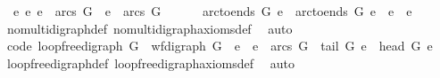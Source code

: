 \begin{isabellebody}
\ \ {\isacharparenleft}{\kern0pt}{\isasymforall}e{}\ e{}{\isachardot}{\kern0pt}\ e{}\ {\isasymin}\ arcs\ G\ {\isasymand}\ e{}\ {\isasymin}\ arcs\ G\ {\isasymand}\isanewline
\ \ \ \ \ arc{\isacharunderscore}{\kern0pt}to{\isacharunderscore}{\kern0pt}ends\ G\ e{}\ {\isacharequal}{\kern0pt}\ arc{\isacharunderscore}{\kern0pt}to{\isacharunderscore}{\kern0pt}ends\ G\ e{}\ {\isasymlongrightarrow}\ e{}\ {\isacharequal}{\kern0pt}\ e{}{\isacharparenright}{\kern0pt}{\isacharparenright}{\kern0pt}{\isachardoublequoteclose}\isanewline
%
\isadelimproof
\ \ %
\endisadelimproof
%
\isatagproof
{}\isamarkupfalse%
\ nomulti{\isacharunderscore}{\kern0pt}digraph{\isacharunderscore}{\kern0pt}def\ nomulti{\isacharunderscore}{\kern0pt}digraph{\isacharunderscore}{\kern0pt}axioms{\isacharunderscore}{\kern0pt}def\ \isamarkupfalse%
\ auto%
\endisatagproof
{\isafoldproof}%
%
\isadelimproof
\isanewline
%
\endisadelimproof
\isanewline
{}\isamarkupfalse%
\ {\isacharbrackleft}{\kern0pt}code{\isacharbrackright}{\kern0pt}{\isacharcolon}{\kern0pt}\ {\isachardoublequoteopen}loopfree{\isacharunderscore}{\kern0pt}digraph\ G\ {\isacharequal}{\kern0pt}\ {\isacharparenleft}{\kern0pt}wf{\isacharunderscore}{\kern0pt}digraph\ G\ {\isasymand}\ {\isacharparenleft}{\kern0pt}{\isasymforall}e{\isachardot}{\kern0pt}\ \ e\ {\isasymin}\ arcs\ G\ {\isasymlongrightarrow}\ tail\ G\ e\ {\isasymnoteq}\ head\ G\ e{\isacharparenright}{\kern0pt}{\isacharparenright}{\kern0pt}{\isachardoublequoteclose}\isanewline
%
\isadelimproof
\ \ %
\endisadelimproof
%
\isatagproof
{}\isamarkupfalse%
\ loopfree{\isacharunderscore}{\kern0pt}digraph{\isacharunderscore}{\kern0pt}def\ loopfree{\isacharunderscore}{\kern0pt}digraph{\isacharunderscore}{\kern0pt}axioms{\isacharunderscore}{\kern0pt}def\ \isamarkupfalse%
\ auto%
\endisatagproof
{\isafoldproof}%
%
\isadelimproof
\isanewline
%
\endisadelimproof
%
\isadelimtheory
\ \ \isanewline
%
\endisadelimtheory
%
\isatagtheory
{}\isamarkupfalse%
%
\endisatagtheory
{\isafoldtheory}%
%
\isadelimtheory
%
\endisadelimtheory
%
\end{isabellebody}%
\endinput

